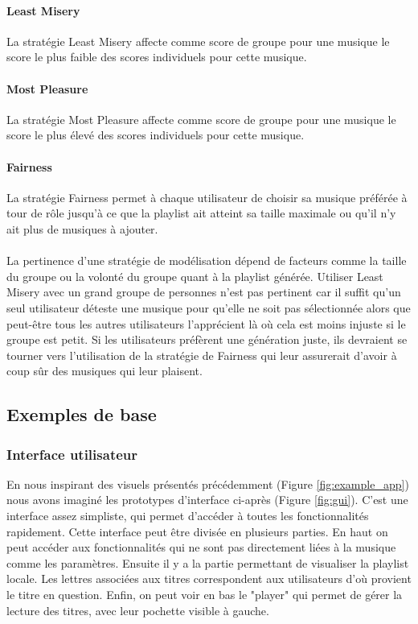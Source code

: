 \documentclass{article}
\begin{document}
 		\paragraph{Least Misery}
 		La stratégie Least Misery affecte comme score de groupe pour une musique le score le plus faible des scores individuels pour cette musique.
 		
 		\paragraph{Most Pleasure}
 		La stratégie Most Pleasure affecte comme score de groupe pour une musique le score le plus élevé des scores individuels pour cette musique.
 		
 		\paragraph{Fairness}
 		La stratégie Fairness permet à chaque utilisateur de choisir sa musique préférée à tour de rôle jusqu'à ce que la playlist ait atteint sa taille maximale ou qu'il n'y ait plus de musiques à ajouter.
        
		\paragraph{}
		La pertinence d'une stratégie de modélisation dépend de facteurs comme la taille du groupe ou la volonté du groupe quant à la playlist générée. Utiliser Least Misery avec un grand groupe de personnes n'est pas pertinent car il suffit qu'un seul utilisateur déteste une musique pour qu'elle ne soit pas sélectionnée alors que peut-être tous les autres utilisateurs l'apprécient là où cela est moins injuste si le groupe est petit. Si les utilisateurs préfèrent une génération juste, ils devraient se tourner vers l'utilisation de la stratégie de Fairness qui leur assurerait d'avoir à coup sûr des musiques qui leur plaisent.

		

		\subsection{Exemples de base}

        \subsubsection{Interface utilisateur}\label{interface_utilisateur}
            	En nous inspirant des visuels présentés précédemment (Figure \ref{fig:example_app}) nous avons imaginé les prototypes d'interface ci-après (Figure \ref{fig:gui}). C'est une interface assez simpliste, qui permet d'accéder à toutes les fonctionnalités rapidement. Cette interface peut être divisée en plusieurs parties. En haut on peut accéder aux fonctionnalités qui ne sont pas directement liées à la musique comme les paramètres. Ensuite il y a la partie permettant de visualiser la playlist locale. Les lettres associées aux titres correspondent aux utilisateurs d'où provient le titre en question.
            	Enfin, on peut voir en bas le "player" qui permet de gérer la lecture des titres, avec leur pochette visible à gauche.
\end{document}
